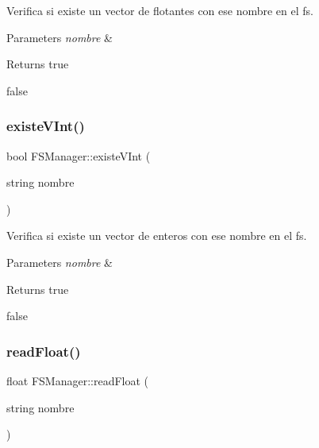 Verifica si existe un vector de flotantes con ese nombre en el fs. 


\begin{DoxyParams}{Parameters}
{\em nombre} & \\
\hline
\end{DoxyParams}
\begin{DoxyReturn}{Returns}
true 

false 
\end{DoxyReturn}
\mbox{\label{classFSManager_a500170a86c9fcaddd716fe962283742c}} 
\subsubsection{\texorpdfstring{existe\+V\+Int()}{existeVInt()}}
{\footnotesize\ttfamily bool F\+S\+Manager\+::existe\+V\+Int (\begin{DoxyParamCaption}\item[{string}]{nombre }\end{DoxyParamCaption})\hspace{0.3cm}{\ttfamily [inline]}}



Verifica si existe un vector de enteros con ese nombre en el fs. 


\begin{DoxyParams}{Parameters}
{\em nombre} & \\
\hline
\end{DoxyParams}
\begin{DoxyReturn}{Returns}
true 

false 
\end{DoxyReturn}
\mbox{\label{classFSManager_a5362f82406fa9501f3c5126987565dc1}} 
\subsubsection{\texorpdfstring{read\+Float()}{readFloat()}}
{\footnotesize\ttfamily float F\+S\+Manager\+::read\+Float (\begin{DoxyParamCaption}\item[{string}]{nombre }\end{DoxyParamCaption})\hspace{0.3cm}{\ttfamily [inline]}}



